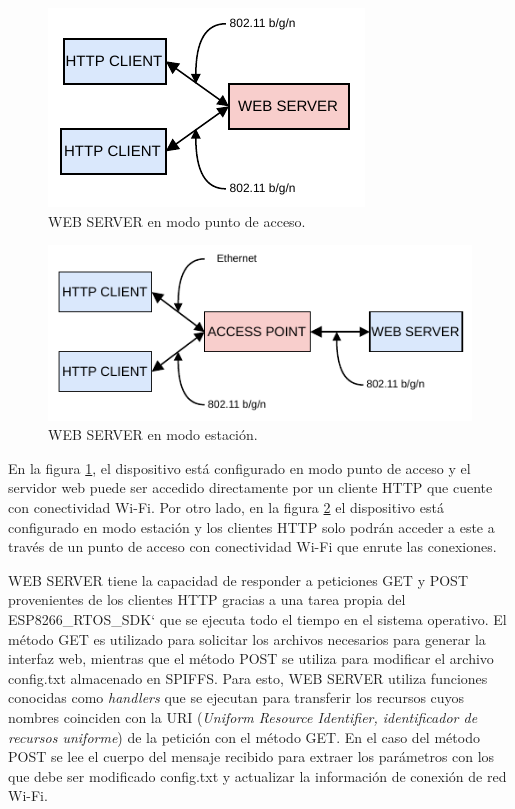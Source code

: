 \begin{figure}[h]
	\centering
	\includegraphics[scale=1]{./Figures/web_server_ap.pdf}
	\caption{WEB SERVER en modo punto de acceso.}
		\label{fig:serverAP}
\end{figure}

\begin{figure}[h]
	\centering
	\includegraphics[scale=1]{./Figures/web_server_sta.pdf}
	\caption{WEB SERVER en modo estación.}
		\label{fig:serverSTA}
\end{figure}

En la figura \ref{fig:serverAP}, el dispositivo está configurado en modo punto de acceso y el servidor web puede ser accedido directamente por un cliente HTTP que cuente con conectividad Wi-Fi. Por otro lado, en la figura \ref{fig:serverSTA} el dispositivo está configurado en modo estación y los clientes HTTP solo podrán acceder a este a través de un punto de acceso con conectividad Wi-Fi que enrute las conexiones.

WEB SERVER tiene la capacidad de responder a peticiones GET y POST provenientes de los clientes HTTP gracias a una tarea propia del ESP8266\_RTOS\_SDK` que se ejecuta todo el tiempo en el sistema operativo. El método GET es utilizado para solicitar los archivos necesarios para generar la interfaz web, mientras que el método POST se utiliza para modificar el archivo config.txt almacenado en SPIFFS. Para esto, WEB SERVER utiliza funciones conocidas como \textit{handlers} que se ejecutan para transferir los recursos cuyos nombres coinciden con la URI (\textit{Uniform Resource Identifier, identificador de recursos uniforme}) de la petición con el método GET. En el caso del método POST se lee el cuerpo del mensaje recibido para extraer los parámetros con los que debe ser modificado config.txt y actualizar la información de conexión de red Wi-Fi.

